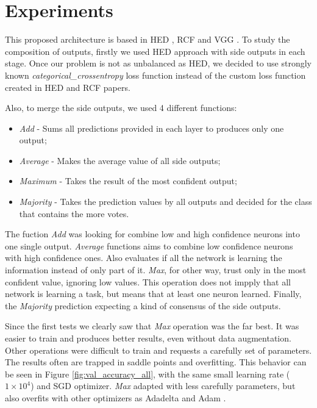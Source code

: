 \section{Experiments}
\label{sec:experiments}

This proposed architecture is based in HED \cite{Xie:2017:HED:3158436.3158453}, RCF \cite{RCF:8100105} and VGG \cite{simonyan2014}. To study the composition of outputs, firstly we used HED approach with side outputs in each stage. Once our problem is not as unbalanced as HED, we decided to use strongly known \textit{categorical\_crossentropy} loss function instead of the custom loss function created in HED and RCF papers.

Also, to merge the side outputs, we used 4 different functions:

\begin{itemize}
 \item \textit{Add} - Sums all predictions provided in each layer to produces only one output;
 
 \item \textit{Average} - Makes the average value of all side outputs;
 
 \item \textit{Maximum} - Takes the result of the most confident output;
 
 \item \textit{Majority} - Takes the prediction values by all outputs and decided for the class that contains the more votes.
\end{itemize}

The fuction \textit{Add} was looking for combine low and high confidence neurons into one single output. \textit{Average} functions aims to combine low confidence neurons with high confidence ones. Also evaluates if all the network is learning the information instead of only part of it. \textit{Max}, for other way, trust only in the most confident value, ignoring low values. This operation does not impply that all network is learning a task, but means that at least one neuron learned. Finally, the \textit{Majority} prediction expecting a kind of consensus of the side outputs.

Since the first tests we clearly saw that \textit{Max} operation was the far best. It was easier to train and produces better results, even without data augmentation. Other operations were difficult to train and requests a carefully set of parameters. The results often are trapped in saddle points and overfitting. This behavior can be seen in Figure \ref{fig:val_accuracy_all}, with the same small learning rate ($1 \times 10^4$) and SGD optimizer. \textit{Max} adapted with less carefully parameters, but also overfits with other optimizers as Adadelta \cite{Adadelta:2012} and Adam \cite{Adam:2014}.

